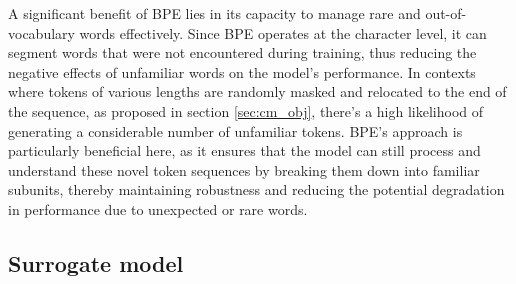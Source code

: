 A significant benefit of BPE lies in its capacity to manage rare and out-of-vocabulary words effectively. Since BPE operates at the character level, it can segment words that were not encountered during training, thus reducing the negative effects of unfamiliar words on the model's performance. 
In contexts where tokens of various lengths are randomly masked and relocated to the end of the sequence, as proposed in section \ref{sec:cm_obj}, there's a high likelihood of generating a considerable number of unfamiliar tokens. BPE's approach is particularly beneficial here, as it ensures that the model can still process and understand these novel token sequences by breaking them down into familiar subunits, thereby maintaining robustness and reducing the potential degradation in performance due to unexpected or rare words.




















































































\subsection{Surrogate model}\label{app:surrogate_model}

